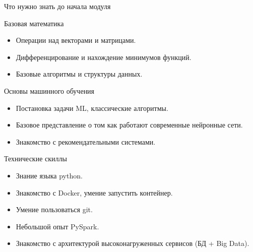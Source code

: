 \documentclass[11pt,aspectratio=169,handout]{beamer}
\begin{document}
\begin{frame}{Что нужно знать до начала модуля}

\begin{footnotesize}

Базовая математика
\begin{itemize}
\item Операции над векторами и матрицами.
\item Дифференцирование и нахождение минимумов функций.
\item Базовые алгоритмы и структуры данных.
\end{itemize}

Основы машинного обучения
\begin{itemize}
\item Постановка задачи ML, классические алгоритмы.
\item Базовое представление о том как работают современные нейронные сети.
\item Знакомство с рекомендательными системами.
\end{itemize}

Технические скиллы
\begin{itemize}
\item Знание языка python.
\item Знакомство с Docker, умение запустить контейнер.
\item Умение пользоваться git.
\item Небольшой опыт PySpark.
\item Знакомство с архитектурой высоконагруженных сервисов (БД + Big Data).
\end{itemize}

\end{footnotesize}

\end{frame}
\end{document}
